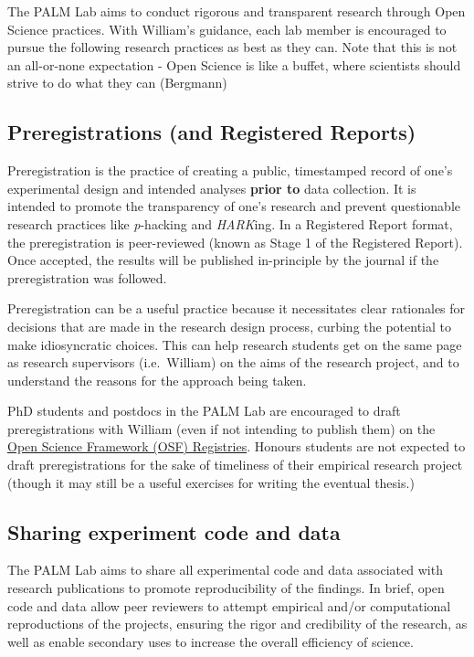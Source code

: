 \documentclass[
]{book}
\begin{document}
The PALM Lab aims to conduct rigorous and transparent research through Open Science practices. With William's guidance, each lab member is encouraged to pursue the following research practices as best as they can. Note that this is not an all-or-none expectation - Open Science is like a buffet, where scientists should strive to do what they can (Bergmann)

\hypertarget{preregistrations-and-registered-reports}{%
\subsection{Preregistrations (and Registered Reports)}\label{preregistrations-and-registered-reports}}

Preregistration is the practice of creating a public, timestamped record of one's experimental design and intended analyses \textbf{prior to} data collection. It is intended to promote the transparency of one's research and prevent questionable research practices like \emph{p}-hacking and \emph{HARK}ing. In a Registered Report format, the preregistration is peer-reviewed (known as Stage 1 of the Registered Report). Once accepted, the results will be published in-principle by the journal if the preregistration was followed.

Preregistration can be a useful practice because it necessitates clear rationales for decisions that are made in the research design process, curbing the potential to make idiosyncratic choices. This can help research students get on the same page as research supervisors (i.e.~William) on the aims of the research project, and to understand the reasons for the approach being taken.

PhD students and postdocs in the PALM Lab are encouraged to draft preregistrations with William (even if not intending to publish them) on the \href{https://osf.io/registries/osf/new}{Open Science Framework (OSF) Registries}. Honours students are not expected to draft preregistrations for the sake of timeliness of their empirical research project (though it may still be a useful exercises for writing the eventual thesis.)

\hypertarget{sharing-experiment-code-and-data}{%
\subsection{Sharing experiment code and data}\label{sharing-experiment-code-and-data}}

The PALM Lab aims to share all experimental code and data associated with research publications to promote reproducibility of the findings. In brief, open code and data allow peer reviewers to attempt empirical and/or computational reproductions of the projects, ensuring the rigor and credibility of the research, as well as enable secondary uses to increase the overall efficiency of science.
\end{document}
